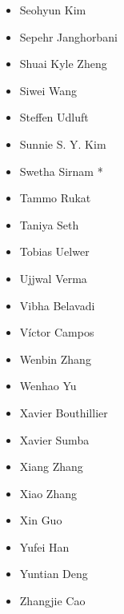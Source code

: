 \begin{multicols}{3}
\begin{itemize}[label={}]
\item Seohyun Kim
\item Sepehr Janghorbani
\item Shuai Kyle Zheng
\item Siwei Wang
\item Steffen Udluft
\item Sunnie S. Y. Kim
\item Swetha Sirnam *
\item Tammo Rukat
\item Taniya Seth
\item Tobias Uelwer
\item Ujjwal Verma
\item Vibha Belavadi
\item Víctor Campos
\item Wenbin Zhang
\item Wenhao Yu
\item Xavier Bouthillier
\item Xavier Sumba
\item Xiang Zhang
\item Xiao Zhang
\item Xin Guo
\item Yufei Han
\item Yuntian Deng
\item Zhangjie Cao
\end{itemize}
\end{multicols}
\endgroup




